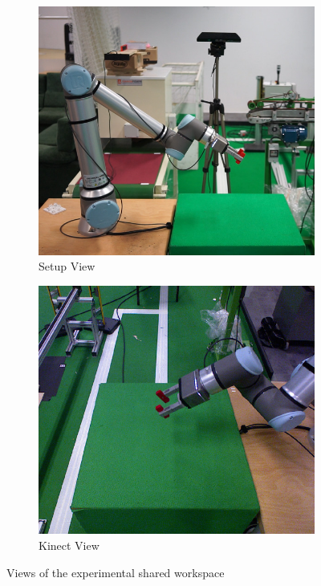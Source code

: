 \begin{figure}[h]
    \centering
    \begin{subfigure}{.5\textwidth}
      \centering
      \includegraphics[width=.9\linewidth]{figs/chp6/setup.jpg}
      \caption{Setup View}
      \label{fig:setup}
    \end{subfigure}%
    \begin{subfigure}{.5\textwidth}
      \centering
      \includegraphics[width=.9\linewidth]{figs/chp6/kinect.jpg}
      \caption{Kinect View}
      \label{fig:kinect}
    \end{subfigure}
    \caption{Views of the experimental shared workspace}
    \label{fig:setup_and_kinect}
    \end{figure}

